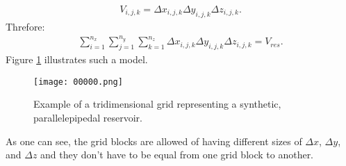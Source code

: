 	\begin{align}
	\label{e00000}
	V_{i,j,k} = \Delta x_{i,j,k} \Delta y_{i,j,k} \Delta z_{i,j,k}.
	\end{align}
Threfore:
	\begin{align}
	\label{e000000}
	\sum_{i=1}^{n_x}\sum_{j=1}^{n_y}\sum_{k=1}^{n_z}\Delta x_{i,j,k} \Delta y_{i,j,k}\Delta z_{i,j,k}=V_{res}.
	\end{align}
Figure \ref{f0} illustrates such a model.
\begin{figure}[h]
	\centering
	\texttt{[image: 00000.png]}\\
	\caption{Example of a tridimensional grid representing a synthetic, parallelepipedal reservoir.}
	\label{f0}
\end{figure}
\noindent
As one can see, the grid blocks are allowed of having different sizes of $\Delta x$, $\Delta y$, and $\Delta z$ and they don't have to be equal from one grid block to another.

